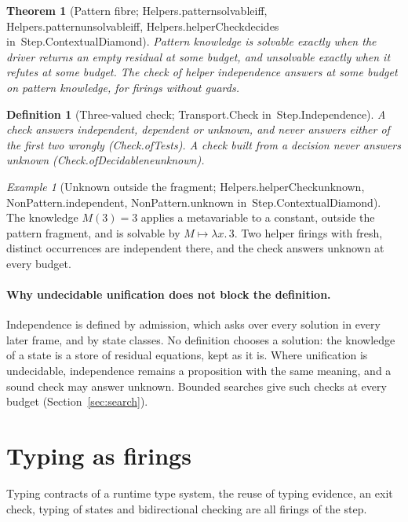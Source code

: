 \documentclass[11pt]{article}
\newtheorem{definition}{Definition}
\newtheorem{theorem}{Theorem}
\theoremstyle{remark}
\newtheorem{example}{Example}
\newcommand{\lean}[1]{{\ttfamily\def\_{\textunderscore\allowbreak}#1}}
\newcommand{\inmod}[1]{in~{\ttfamily\def\_{\textunderscore\allowbreak}#1}}
\begin{document}
\begin{theorem}[Pattern fibre; \lean{Helpers.pattern\_solvable\_iff}, \lean{Helpers.pattern\_unsolvable\_iff}, \lean{Helpers.helperCheck\_decides} \inmod{Step.ContextualDiamond}]
Pattern knowledge is solvable exactly when the driver returns an empty residual at some budget, and
unsolvable exactly when it refutes at some budget. The check of helper independence answers at some
budget on pattern knowledge, for firings without guards.
\end{theorem}

\begin{definition}[Three-valued check; \lean{Transport.Check} \inmod{Step.Independence}]
A check answers independent, dependent or unknown, and never answers either of the first two wrongly
(\lean{Check.ofTests}). A check built from a decision never answers unknown
(\lean{Check.ofDecidable\_ne\_unknown}).
\end{definition}

\begin{example}[Unknown outside the fragment; \lean{Helpers.helperCheck\_unknown}, \lean{NonPattern.independent}, \lean{NonPattern.unknown} \inmod{Step.ContextualDiamond}]
The knowledge $M(3)=3$ applies a metavariable to a constant, outside the pattern fragment, and is solvable by
$M\mapsto\lambda x.\,3$. Two helper firings with fresh, distinct occurrences are independent there, and the
check answers unknown at every budget.
\end{example}

\paragraph{Why undecidable unification does not block the definition.} Independence is defined by
admission, which asks over every solution in every later frame, and by state classes. No definition
chooses a solution: the knowledge of a state is a store of residual equations, kept as it is. Where
unification is undecidable, independence remains a proposition with the same meaning, and a sound check
may answer unknown. Bounded searches give such checks at every budget (Section~\ref{sec:search}).

\section{Typing as firings}\label{sec:typing}

Typing contracts of a runtime type system, the reuse of typing evidence, an exit check, typing of
states and bidirectional checking are all firings of the step.
\end{document}
